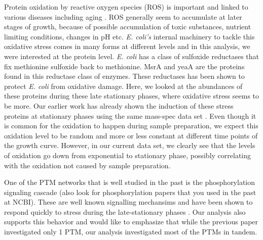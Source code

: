 \documentclass[12pt]{article}
\begin{document}
Protein oxidation by reactive oxygen species (ROS) is important and linked to various diseases including aging \cite{Stadtman1992}. ROS generally seem to accumulate at later stages of growth, because of possible accumulation of toxic substances, nutrient limiting conditions, changes in pH etc. \emph{E. coli's} internal machinery to tackle this oxidative stress comes in many forms at different levels and in this analysis, we were interested at the protein level. \emph{E. coli} has a class of sulfoxide reductases \cite{Brotetal1981} \cite{ZhangWeissbach2008} that fix methionine sulfoxide back to methionine. MsrA and yeaA are the proteins found in this reductase class of enzymes. These reductases has been shown to protect \emph{E. coli} from oxidative damage\cite{Ezratyetal2004}. Here, we looked at the abundances of these proteins during these late stationary phases, where oxidative stress seems to be more. Our earlier work has already shown the induction of these stress proteins at stationary phases using the same mass-spec data set \cite{Houseretal2015}. Even though it is common for the oxidation to happen during sample preparation, we expect this oxidation level to be random and more or less constant at different time points of the growth curve. However, in our current data set, we clearly see that the levels of oxidation go down from exponential to stationary phase, possibly correlating with the oxidation not caused by sample preparation.

One of the PTM networks that is well studied in the past is the phosphorylation signaling cascade\cite{Olsenetal2006} (also look for phosphorylation papers that you used in the past at NCBI). These are well known signalling mechansims and have been shown to respond quickly to stress during the late-stationary phases \cite{Soaresetal2013}. Our analysis also supports this behavior and would like to emphasize that while the previous paper investigated only 1 PTM, our analysis investigated most of the PTMs in tandem. 





\end{document}

